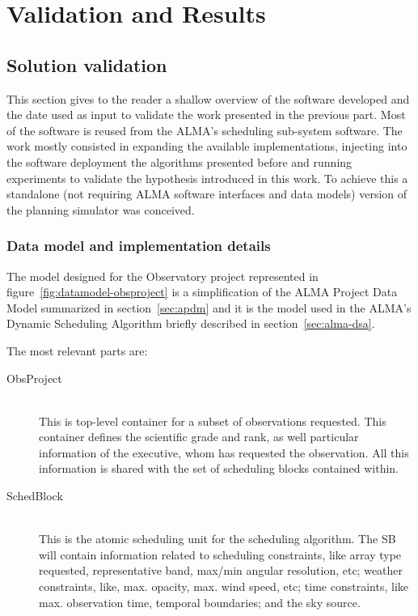 \chapter{Validation and Results}

\section{Solution validation}

This section gives to the reader a shallow overview of the software developed and the date used as input to validate the work presented in the previous part. Most of the software is reused from the ALMA's scheduling sub-system software. The work mostly consisted in expanding the available implementations, injecting into the software deployment the algorithms presented before and running experiments to validate the hypothesis introduced in this work. To achieve this a standalone (not requiring ALMA software interfaces and data models) version of the planning simulator was conceived. 

\subsection {Data model and implementation details}

The model designed for the Observatory project represented in figure~\ref{fig:datamodel-obsproject} is a simplification of the ALMA Project Data Model summarized in section~\ref{sec:apdm} and it is the model used in the ALMA's Dynamic Scheduling Algorithm briefly described in section~\ref{sec:alma-dsa}.

The most relevant parts are: 
\begin{description}
\item[ObsProject] \hfill \\
This is top-level container for a subset of observations requested. This container defines the scientific grade and rank, as well particular information of the executive, whom has requested the observation. All this information is shared with the set of scheduling blocks contained within.
\item[SchedBlock] \hfill \\
This is the atomic scheduling unit for the scheduling algorithm. The SB will contain information related to scheduling constraints, like array type requested, representative band, max/min angular resolution, etc; weather constraints, like, max. opacity, max. wind speed, etc; time constraints, like max. observation time, temporal boundaries; and the sky source.
\end{description}

